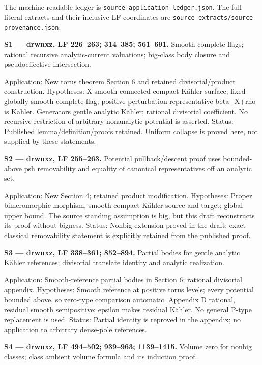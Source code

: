 \documentclass[11pt]{article}
\begin{document}
The machine-\allowbreak{}readable ledger is \texttt{source-\allowbreak{}application-\allowbreak{}ledger.json}. The full literal extracts and their inclusive LF coordinates are \texttt{source-\allowbreak{}extracts/\allowbreak{}source-\allowbreak{}provenance.json}.

\textbf{S1 — drwnxz, LF 226–263; 314–385; 561–691.} Smooth complete flags; rational recursive analytic-\allowbreak{}current valuations; big-\allowbreak{}class body closure and pseudoeffective intersection.

Application: New torus theorem Section 6 and retained divisorial/\allowbreak{}product construction. Hypotheses: X smooth connected compact Kähler surface; fixed globally smooth complete flag; positive perturbation representative beta\_\allowbreak{}X+rho is Kähler. Generators gentle analytic Kähler; rational divisorial coefficient. No recursive restriction of arbitrary nonanalytic potential is asserted. Status: Published lemma/\allowbreak{}definition/\allowbreak{}proofs retained. Uniform collapse is proved here, not supplied by these statements.

\textbf{S2 — drwnxz, LF 255–263.} Potential pullback/\allowbreak{}descent proof uses bounded-\allowbreak{}above psh removability and equality of canonical representatives off an analytic set.

Application: New Section 4; retained product modification. Hypotheses: Proper bimeromorphic morphism, smooth compact Kähler source and target; global upper bound. The source standing assumption is big, but this draft reconstructs its proof without bigness. Status: Nonbig extension proved in the draft; exact classical removability statement is explicitly retained from the published proof.

\textbf{S3 — drwnxz, LF 338–361; 852–894.} Partial bodies for gentle analytic Kähler references; divisorial translate identity and analytic realization.

Application: Smooth-\allowbreak{}reference partial bodies in Section 6; rational divisorial appendix. Hypotheses: Smooth reference at positive torus levels; every potential bounded above, so zero-\allowbreak{}type comparison automatic. Appendix D rational, residual smooth semipositive; epsilon makes residual Kähler. No general P-\allowbreak{}type replacement is used. Status: Partial identity is reproved in the appendix; no application to arbitrary dense-\allowbreak{}pole references.

\textbf{S4 — drwnxz, LF 494–502; 939–963; 1139–1415.} Volume zero for nonbig classes; class ambient volume formula and its induction proof.
\end{document}
